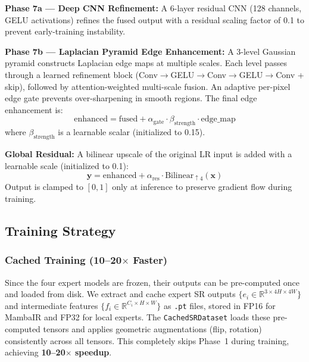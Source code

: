 \documentclass[10pt,twocolumn,letterpaper]{article}
\begin{document}
\noindent\textbf{Phase 7a --- Deep CNN Refinement:}
A 6-layer residual CNN (128 channels, GELU activations) refines the fused output with a residual scaling factor of 0.1 to prevent early-training instability.

\noindent\textbf{Phase 7b --- Laplacian Pyramid Edge Enhancement:}
A 3-level Gaussian pyramid constructs Laplacian edge maps at multiple scales. Each level passes through a learned refinement block (Conv$\to$GELU$\to$Conv$\to$GELU$\to$Conv + skip), followed by attention-weighted multi-scale fusion. An adaptive per-pixel edge gate prevents over-sharpening in smooth regions. The final edge enhancement is:
\begin{equation}
\text{enhanced} = \text{fused} + \alpha_{\text{gate}} \cdot \beta_{\text{strength}} \cdot \text{edge\_map}
\end{equation}
where $\beta_{\text{strength}}$ is a learnable scalar (initialized to 0.15).

\noindent\textbf{Global Residual:} A bilinear upscale of the original LR input is added with a learnable scale (initialized to 0.1):
\begin{equation}
\mathbf{y} = \text{enhanced} + \alpha_{\text{res}} \cdot \text{Bilinear}_{\uparrow 4}(\mathbf{x})
\end{equation}
Output is clamped to $[0,1]$ only at inference to preserve gradient flow during training.

\subsection{Training Strategy}

\subsubsection{Cached Training (10--20$\times$ Faster)}

Since the four expert models are frozen, their outputs can be pre-computed once and loaded from disk. We extract and cache expert SR outputs $\{e_i \in \mathbb{R}^{3 \times 4H \times 4W}\}$ and intermediate features $\{f_i \in \mathbb{R}^{C_i \times H \times W}\}$ as \texttt{.pt} files, stored in FP16 for MambaIR and FP32 for local experts. The \texttt{CachedSRDataset} loads these pre-computed tensors and applies geometric augmentations (flip, rotation) consistently across all tensors. This completely skips Phase~1 during training, achieving \textbf{10--20$\times$ speedup}.
\end{document}
